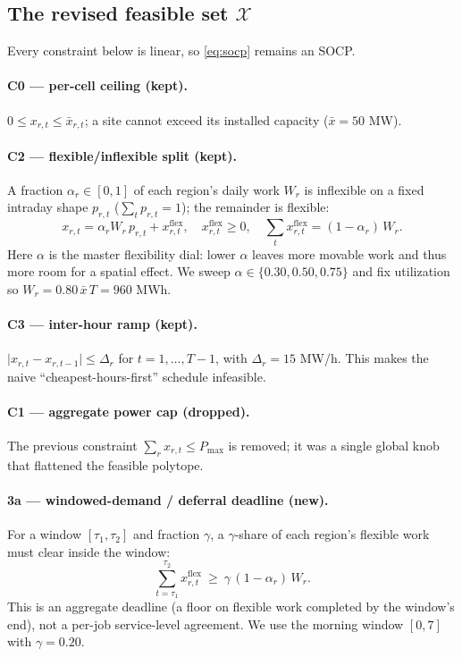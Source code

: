 \documentclass[11pt]{article}
\begin{document}
\subsection{The revised feasible set \texorpdfstring{$\mathcal{X}$}{X}}
Every constraint below is linear, so \eqref{eq:socp} remains an SOCP.

\paragraph{C0 --- per-cell ceiling (kept).}
$0\le x_{r,t}\le \bar x_{r,t}$; a site cannot exceed its installed capacity ($\bar x=50$ MW).

\paragraph{C2 --- flexible/inflexible split (kept).}
A fraction $\alpha_r\in[0,1]$ of each region's daily work $W_r$ is inflexible on a fixed intraday shape
$p_{r,t}$ ($\sum_t p_{r,t}=1$); the remainder is flexible:
\begin{equation}
  x_{r,t}=\alpha_r W_r\,p_{r,t}+x^{\mathrm{flex}}_{r,t},\quad x^{\mathrm{flex}}_{r,t}\ge 0,\quad
  \sum_{t} x^{\mathrm{flex}}_{r,t}=(1-\alpha_r)\,W_r.
  \label{eq:c2}
\end{equation}
Here $\alpha$ is the master flexibility dial: lower $\alpha$ leaves more movable work and thus more room
for a spatial effect. We sweep $\alpha\in\{0.30,0.50,0.75\}$ and fix utilization so $W_r=0.80\,\bar x\,T=960$ MWh.

\paragraph{C3 --- inter-hour ramp (kept).}
$\lvert x_{r,t}-x_{r,t-1}\rvert\le\Delta_r$ for $t=1,\dots,T-1$, with $\Delta_r=15$ MW/h. This makes the
naive ``cheapest-hours-first'' schedule infeasible.

\paragraph{C1 --- aggregate power cap (dropped).}
The previous constraint $\sum_r x_{r,t}\le P_{\max}$ is removed; it was a single global knob that
flattened the feasible polytope.

\paragraph{3a --- windowed-demand / deferral deadline (new).}
For a window $[\tau_1,\tau_2]$ and fraction $\gamma$, a $\gamma$-share of each region's flexible work
must clear inside the window:
\begin{equation}
  \sum_{t=\tau_1}^{\tau_2} x^{\mathrm{flex}}_{r,t}\ \ge\ \gamma\,(1-\alpha_r)\,W_r.
  \label{eq:3a}
\end{equation}
This is an aggregate deadline (a floor on flexible work completed by the window's end), not a per-job
service-level agreement. We use the morning window $[0,7]$ with $\gamma=0.20$.
\end{document}
